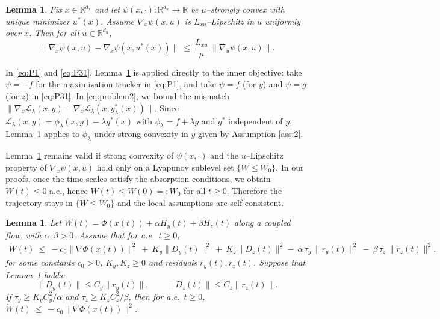 \documentclass{article}
\newtheorem{lemma}[theorem]{Lemma}
\newcommand{\1}{\mathbf{1}}
\begin{document}
\begin{lemma}\label{lem:deviation}
Fix $x\in\mathbb R^{d_x}$ and let $\psi(x,\cdot):\mathbb R^{d_u}\to\mathbb R$ be $\mu$--strongly convex
with unique minimizer $u^*(x)$.
Assume $\nabla_x\psi(x,u)$ is $L_{xu}$--Lipschitz in $u$ uniformly over $x$.
Then for all $u\in\mathbb R^{d_u}$, 
\[
\|\nabla_x\psi(x,u)-\nabla_x\psi(x,u^*(x))\|
\ \le\ \frac{L_{xu}}{\mu}\,\|\nabla_u\psi(x,u)\|.
\]
\end{lemma}
In \ref{eq:P1} and \ref{eq:P31}, Lemma~\ref{lem:deviation} is applied directly to the inner objective:
take $\psi=-f$ for the maximization tracker in \ref{eq:P1}, and take $\psi=f$ (for $y$) and $\psi=g$ (for $z$) in \ref{eq:P31}. In \ref{eq:problem2}, we bound the mismatch
$\|\nabla_x\mathcal L_\lambda(x,y)-\nabla_x\mathcal L_\lambda(x,y_\lambda^*(x))\|$.
Since $\mathcal L_\lambda(x,y)=\phi_\lambda(x,y)-\lambda g^*(x)$ with $\phi_\lambda=f+\lambda g$ and $g^*$ independent of $y$,
Lemma~\ref{lem:deviation} applies to $\phi_\lambda$ under strong convexity in $y$ given by Assumption \ref{ass:2}.

Lemma~\ref{lem:deviation} remains valid if strong convexity of $\psi(x,\cdot)$ and the $u$--Lipschitz property of
$\nabla_x\psi(x,u)$ hold only on a Lyapunov sublevel set $\{W\le W_0\}$.
In our proofs, once the time scales satisfy the absorption conditions, we obtain $\dot W(t)\le 0$ a.e., hence
$W(t)\le W(0)=:W_0$ for all $t\ge 0$.
Therefore the trajectory stays in $\{W\le W_0\}$ and the local assumptions are self-consistent.
\begin{lemma}\label{lem:timescale}
Let $W(t)=\Phi(x(t))+\alpha H_y(t)+\beta H_z(t)$ along a coupled flow, with $\alpha,\beta>0$.
Assume that for a.e.\ $t\ge 0$,
\begin{equation}\label{eq:timescale-premise}
\begin{aligned}
\dot W(t)\ \le\ -c_0\|\nabla \Phi(x(t))\|^2
\ +\ K_y\|D_y(t)\|^2\ +\ K_z\|D_z(t)\|^2 
-\ \alpha\,\tau_y\,\|r_y(t)\|^2\ -\ \beta\,\tau_z\,\|r_z(t)\|^2.
\end{aligned}
\end{equation}
for some constants $c_0>0$, $K_y,K_z\ge 0$ and residuals $r_y(t),r_z(t)$.
Suppose that Lemma~\ref{lem:deviation} holds:
\[
\|D_y(t)\|\le C_y\|r_y(t)\|,
\qquad
\|D_z(t)\|\le C_z\|r_z(t)\|.
\]
If $\tau_y\ge K_yC_y^2/\alpha$ and $\tau_z\ge K_zC_z^2/\beta$, then for a.e.\ $t\ge 0$,
$\dot W(t)\ \le\ -c_0\|\nabla \Phi(x(t))\|^2$.

\end{lemma}
\end{document}
